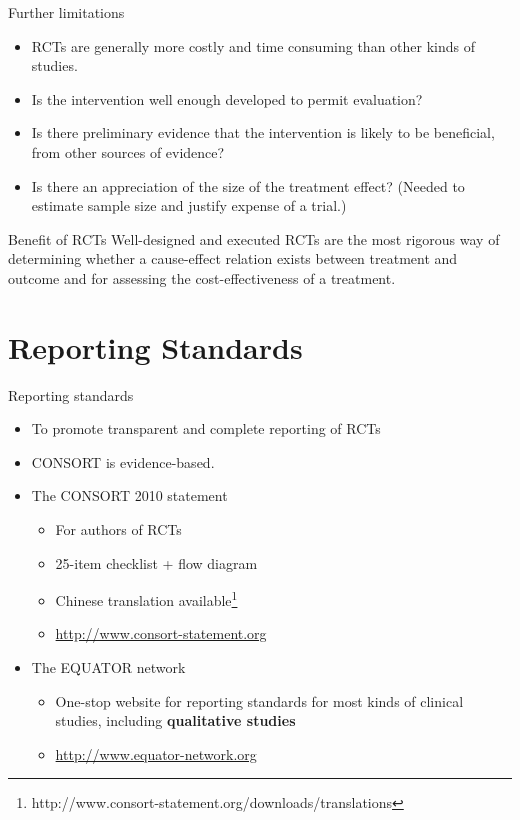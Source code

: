 \documentclass{beamer}
\begin{document}
% 
\begin{frame}{Further limitations}
	\begin{itemize}
	\item RCTs are generally more costly and time consuming than other kinds of studies.
	\item Is the intervention well enough developed to permit evaluation?
	\item Is there preliminary evidence that the intervention is likely to be beneficial, from other sources of evidence?
	\item Is there an appreciation of the size of the treatment effect? (Needed to estimate sample size and justify expense of a trial.)
	\end{itemize}
\end{frame}

% 
\begin{frame}{Benefit of RCTs}
Well-designed and executed RCTs are the most rigorous way of determining whether a cause-effect relation exists between treatment and outcome and for assessing the cost-effectiveness of a treatment.
\end{frame}

\section*{Reporting Standards}

%
\begin{frame}
\center{\Huge{\textcolor{darkgray}{Reporting Standards}}}
\end{frame}

% 
\begin{frame}{Reporting standards}
	\begin{itemize}
	\item To promote transparent and complete reporting of RCTs
	\item CONSORT is evidence-based.
	\item The CONSORT 2010 statement
		\begin{itemize}
		\item For authors of RCTs
		\item 25-item checklist + flow diagram
		\item Chinese translation available\footnote{\scriptsize{http://www.consort-statement.org/downloads/translations}}
		\item \url{http://www.consort-statement.org}
		\end {itemize}
	\item The EQUATOR network
		\begin{itemize}
		\item One-stop website for reporting standards for most kinds of clinical studies, including \textbf{qualitative studies}
		\item \url{http://www.equator-network.org}
		\end{itemize}
	\end {itemize}
\end{frame}
\end{document}
